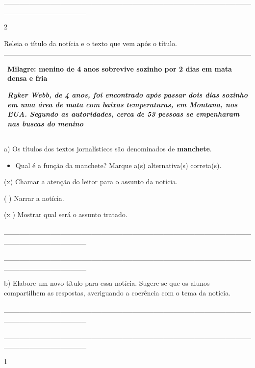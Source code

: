 \begin{itemize}
{{{\begin{itemize}
\begin{itemize}
\begin{itemize}
\_\_\_\_\_\_\_\_\_\_\_\_\_\_\_\_\_\_\_\_\_\_\_\_\_\_\_\_\_\_\_\_\_\_\_\_\_\_\_\_\_\_\_\_\_\_\_\_\_\_\_\_\_\_\_\_\_\_\_\_\_\_\_\_

\num{2}

Releia o título da notícia e o texto que vem após o título.

\begin{longtable}[]{@{}l@{}}
\toprule
\begin{minipage}[t]{0.97\columnwidth}\raggedright\strut
\textbf{Milagre: menino de 4 anos sobrevive sozinho por 2 dias em mata
densa e fria}

\emph{Ryker Webb, de 4 anos, foi encontrado após passar dois dias
sozinho em uma área de mata com baixas temperaturas, em Montana, nos
EUA. Segundo as autoridades, cerca de 53 pessoas se empenharam nas
buscas do menino}\strut
\end{minipage}\tabularnewline
\bottomrule
\end{longtable}

a) Os títulos dos textos jornalísticos são denominados de
\textbf{manchete}.

\begin{itemize}
\item
  Qual é a função da manchete? Marque a(s) alternativa(s) correta(s).
\end{itemize}

(x) Chamar a atenção do leitor para o assunto da notícia.

( ) Narrar a notícia.

(x ) Mostrar qual será o assunto tratado.

\_\_\_\_\_\_\_\_\_\_\_\_\_\_\_\_\_\_\_\_\_\_\_\_\_\_\_\_\_\_\_\_\_\_\_\_\_\_\_\_\_\_\_\_\_\_\_\_\_\_\_\_\_\_\_\_\_\_\_\_\_\_\_\_

\_\_\_\_\_\_\_\_\_\_\_\_\_\_\_\_\_\_\_\_\_\_\_\_\_\_\_\_\_\_\_\_\_\_\_\_\_\_\_\_\_\_\_\_\_\_\_\_\_\_\_\_\_\_\_\_\_\_\_\_\_\_\_\_

b) Elabore um novo título para essa notícia. Sugere-se que os alunos
compartilhem as respostas, averiguando a coerência com o tema da
notícia.

\_\_\_\_\_\_\_\_\_\_\_\_\_\_\_\_\_\_\_\_\_\_\_\_\_\_\_\_\_\_\_\_\_\_\_\_\_\_\_\_\_\_\_\_\_\_\_\_\_\_\_\_\_\_\_\_\_\_\_\_\_\_\_\_

\_\_\_\_\_\_\_\_\_\_\_\_\_\_\_\_\_\_\_\_\_\_\_\_\_\_\_\_\_\_\_\_\_\_\_\_\_\_\_\_\_\_\_\_\_\_\_\_\_\_\_\_\_\_\_\_\_\_\_\_\_\_\_\_


\num{1}


\end{itemize}
\end{itemize}
\end{itemize}}}}
\end{itemize}
